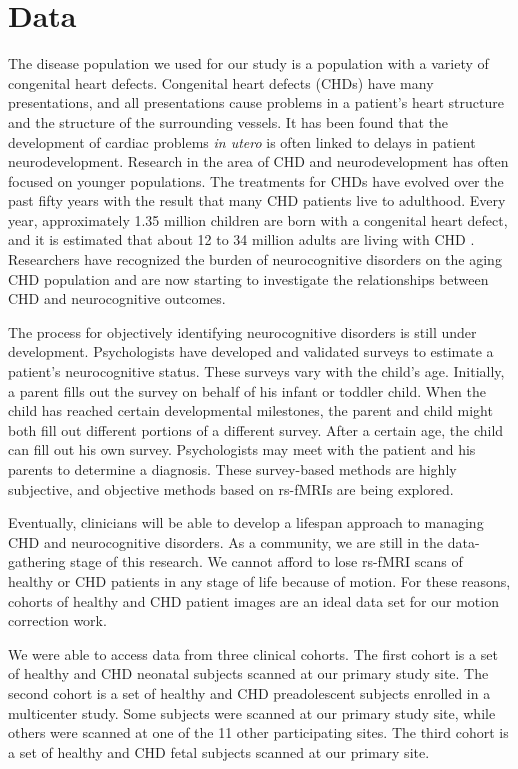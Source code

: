 \section{Data}

The disease population we used for our study is a population with a variety of congenital heart defects. Congenital heart defects (CHDs) have many presentations, and all presentations cause problems in a patient's heart structure and the structure of the surrounding vessels. It has been found that the development of cardiac problems \textit{in utero} is often linked to delays in patient neurodevelopment. Research in the area of CHD and neurodevelopment has often focused on younger populations. The treatments for CHDs have evolved over the past fifty years with the result that many CHD patients live to adulthood. Every year, approximately 1.35 million children are born with a congenital heart defect, and it is estimated that about 12 to 34 million adults are living with CHD \cite{VanderLinde2011}. Researchers have recognized the burden of neurocognitive disorders on the aging CHD population and are now starting to investigate the relationships between CHD and neurocognitive outcomes.

The process for objectively identifying neurocognitive disorders is still under development. Psychologists have developed and validated surveys to estimate a patient's neurocognitive status. These surveys vary with the child's age. Initially, a parent fills out the survey on behalf of his infant or toddler child. When the child has reached certain developmental milestones, the parent and child might both fill out different portions of a different survey. After a certain age, the child can fill out his own survey. Psychologists may meet with the patient and his parents to determine a diagnosis. These survey-based methods are highly subjective, and objective methods based on rs-fMRIs are being explored. 

Eventually, clinicians will be able to develop a lifespan approach to managing CHD and neurocognitive disorders. As a community, we are still in the data-gathering stage of this research. We cannot afford to lose rs-fMRI scans of healthy or CHD patients in any stage of life because of motion. For these reasons, cohorts of healthy and CHD patient images are an ideal data set for our motion correction work. 

We were able to access data from three clinical cohorts. The first cohort is a set of healthy and CHD neonatal subjects scanned at our primary study site. The second cohort is a set of healthy and CHD preadolescent subjects enrolled in a multicenter study. Some subjects were scanned at our primary study site, while others were scanned at one of the 11 other participating sites. The third cohort is a set of healthy and CHD fetal subjects scanned at our primary site.

